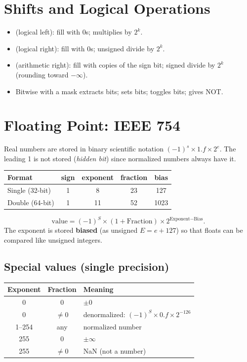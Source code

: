 \section{Shifts and Logical Operations}

\begin{itemize}
  \item {} (logical left): fill with 0s; multiplies by $2^k$.
  \item {} (logical right): fill with 0s; unsigned divide by $2^k$.
  \item {} (arithmetic right): fill with copies of the sign bit;
    signed divide by $2^k$ (rounding toward $-\infty$).
  \item Bitwise  with a mask extracts bits;  sets bits;
     toggles bits;  gives NOT.
\end{itemize}

\section{Floating Point: IEEE 754}

Real numbers are stored in binary scientific notation
$(-1)^s \times 1.f \times 2^{e}$. The leading 1 is not stored
(\emph{hidden bit}) since normalized numbers always have it.

\begin{center}
\begin{tabular}{lcccc}
\toprule
Format & sign & exponent & fraction & bias \\
\midrule
Single (32-bit) & 1 & 8 & 23 & 127 \\
Double (64-bit) & 1 & 11 & 52 & 1023 \\
\bottomrule
\end{tabular}
\end{center}

\[
\text{value} = (-1)^S \times (1 + \text{Fraction}) \times 2^{\text{Exponent} - \text{Bias}}.
\]
The exponent is stored \textbf{biased} (as unsigned $E = e + 127$) so that
floats can be compared like unsigned integers.

\subsection{Special values (single precision)}
\begin{center}
\begin{tabular}{ccl}
\toprule
Exponent & Fraction & Meaning \\
\midrule
0 & 0 & $\pm 0$ \\
0 & $\ne 0$ & denormalized: $(-1)^S \times 0.f \times 2^{-126}$ \\
1--254 & any & normalized number \\
255 & 0 & $\pm\infty$ \\
255 & $\ne 0$ & NaN (not a number) \\
\bottomrule
\end{tabular}
\end{center}

